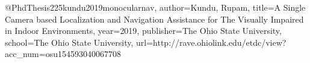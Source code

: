@PhdThesis{225kundu2019monocularnav,
author={Kundu, Rupam},
title={A Single Camera based Localization and Navigation Assistance for The Visually Impaired in Indoor Environments},
year={2019},
publisher={The Ohio State University},
school={The Ohio State University},
url={http://rave.ohiolink.edu/etdc/view?acc_num=osu154593040067708}
}